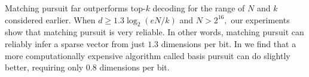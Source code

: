 Matching pursuit far outperforms top-$k$ decoding for the range of $N$ and $k$ considered earlier. When $d \ge 1.3 \log_2 (e N /k)$ and $N > 2^{16},$ our experiments show that matching pursuit is very reliable. In other words, matching pursuit can reliably infer a sparse vector from just $1.3$ dimensions per bit. In  we find that a more computationally expensive algorithm called basis pursuit can do slightly better, requiring only 0.8 dimensions per bit.
